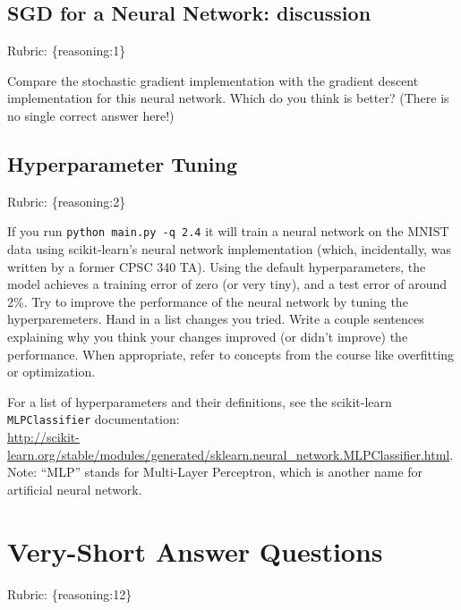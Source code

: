 \documentclass{article}
\def\rubric#1{\gre{Rubric: \{#1\}}}{}
\def\blu#1{{\color{blu}#1}}
\def\gre#1{{\color{gre}#1}}
\begin{document}
\subsection{SGD for a Neural Network: discussion}
\rubric{reasoning:1}

Compare the stochastic gradient implementation with the gradient descent implementation for this neural network. Which do you think is better? (There is no single correct answer here!) 

\subsection{Hyperparameter Tuning}
\rubric{reasoning:2}

If you run \texttt{python main.py -q 2.4} it will train a neural network on the MNIST data using scikit-learn's neural network implementation (which, incidentally, was written by a former CPSC 340 TA).
Using the default hyperparameters, the model achieves a training error of zero (or very tiny), and a test error of around 2\%. 
Try to improve the performance of the neural network by tuning the hyperparemeters.
\blu{Hand in a list changes you tried. Write a couple sentences explaining why you think your changes improved (or didn't improve) the performance. When appropriate, refer to concepts from the course like overfitting or optimization.}

For a list of hyperparameters and their definitions, see the scikit-learn \texttt{MLPClassifier} documentation:\\
\url{http://scikit-learn.org/stable/modules/generated/sklearn.neural_network.MLPClassifier.html}. Note: ``MLP'' stands for Multi-Layer Perceptron,
which is another name for artificial neural network.

\section{Very-Short Answer Questions}
\rubric{reasoning:12}
\end{document}
